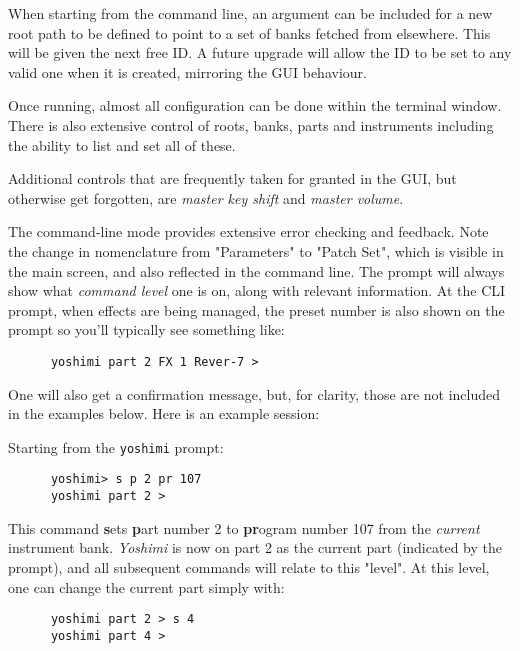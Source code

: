    When starting from the command line, an argument can be included for a new
   root path to be defined to point to a set of banks fetched from elsewhere.
   This will be given the next free ID. A future upgrade will allow the ID to
   be set to any valid one when it is created, mirroring the GUI behaviour.

   Once running, almost all configuration can be done within the terminal
   window.  There is also extensive control of roots, banks, parts and
   instruments including the ability to list and set all of these.

   Additional controls that are frequently taken for granted in the GUI, but
   otherwise get forgotten, are \textsl{master key shift} and \textsl{master
   volume}.


   The command-line mode provides extensive error checking and feedback.
   Note the change in nomenclature from "Parameters" to "Patch Set", which is
   visible in the main screen, and also reflected in the command line.
   The prompt will always show what \textsl{command level}
   one is on, along with relevant information.
   At the CLI prompt, when effects are being managed, the preset number is also
   shown on the prompt so you'll typically see something like:

   \begin{verbatim}
      yoshimi part 2 FX 1 Rever-7 >
   \end{verbatim}

   One will also get a confirmation message, but, for clarity,
   those are not included in the examples below.
   Here is an example session:

   Starting from the \texttt{yoshimi} prompt:

   \begin{verbatim}
      yoshimi> s p 2 pr 107
      yoshimi part 2 >
   \end{verbatim}

   This command \textbf{s}ets \textbf{p}art number 2 to \textbf{pr}ogram
   number 107 from the \textsl{current} instrument bank.
   \textsl{Yoshimi} is now on part 2 as the current part (indicated by the
   prompt), and all subsequent commands will relate to this "level".
   At this level, one can change the current part simply with:

   \begin{verbatim}
      yoshimi part 2 > s 4
      yoshimi part 4 >
   \end{verbatim}

